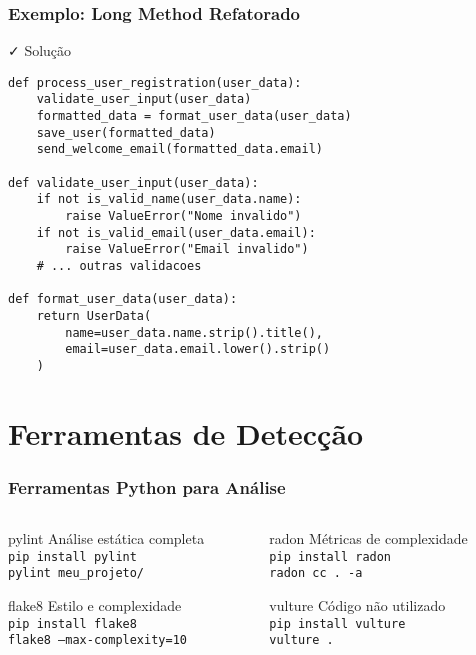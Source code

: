 \documentclass[aspectratio=169]{beamer}
\begin{document}
\begin{frame}[fragile]
\frametitle{Exemplo: Long Method Refatorado}
\begin{block}{\textcolor{cleangreen}{\faCheck} Solução}
\scriptsize
\begin{lstlisting}
def process_user_registration(user_data):
    validate_user_input(user_data)
    formatted_data = format_user_data(user_data)
    save_user(formatted_data)
    send_welcome_email(formatted_data.email)

def validate_user_input(user_data):
    if not is_valid_name(user_data.name):
        raise ValueError("Nome invalido")
    if not is_valid_email(user_data.email):
        raise ValueError("Email invalido")
    # ... outras validacoes

def format_user_data(user_data):
    return UserData(
        name=user_data.name.strip().title(),
        email=user_data.email.lower().strip()
    )
\end{lstlisting}
\end{block}
\end{frame}

\section{Ferramentas de Detecção}

\begin{frame}
\frametitle{Ferramentas Python para Análise}
\begin{columns}
\begin{column}{0.5\textwidth}
\begin{block}{pylint}
\footnotesize
Análise estática completa\\
\texttt{pip install pylint}\\
\texttt{pylint meu\_projeto/}
\end{block}

\begin{block}{flake8}
\footnotesize
Estilo e complexidade\\
\texttt{pip install flake8}\\
\texttt{flake8 --max-complexity=10}
\end{block}
\end{column}

\begin{column}{0.5\textwidth}
\begin{block}{radon}
\footnotesize
Métricas de complexidade\\
\texttt{pip install radon}\\
\texttt{radon cc . -a}
\end{block}

\begin{block}{vulture}
\footnotesize
Código não utilizado\\
\texttt{pip install vulture}\\
\texttt{vulture .}
\end{block}
\end{column}
\end{columns}
\end{frame}
\end{document}
